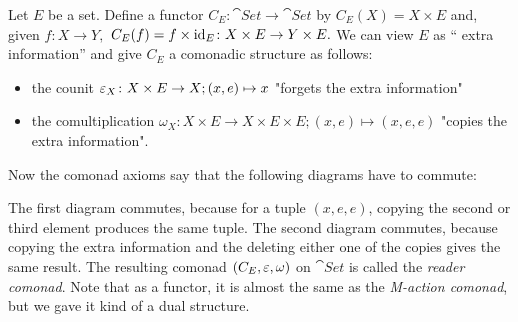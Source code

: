 \begin{example}
    Let $E$ be a set. Define a functor $C_E \colon \cat{Set} \to \cat{Set}$ by
    $C_E(X)=X \times E$ and, given $f \colon X \to Y,$ $C_E(f) = f \times \operatorname{id}_E
    \colon X \times E \to Y \times E.$
    We can view $E$ as `` extra information'' and give $C_E$ a comonadic structure as follows:
    \begin{itemize}
        \item the counit $\varepsilon_X \colon X \times E \to X; (x,e)\mapsto x$ 
         "forgets the extra information"
        \item the comultiplication $\omega_X \colon X \times E \to X \times E \times E;
        (x,e)\mapsto (x,e,e)$ 
        "copies the extra information".
    \end{itemize}
    Now the comonad axioms say that the following diagrams have to commute:
    \begin{figure}[H]
        \small
    \centering
    \begin{subfigure}{0.45\textwidth}
    \centering
    \end{subfigure}
    \hspace{2em}
    \begin{subfigure}{0.46\textwidth}
    \centering
    \end{subfigure}
    \end{figure}
    The first diagram commutes, because for a tuple $(x,e,e)$, copying the second or 
    third element produces the same tuple. The second diagram commutes, because copying 
    the extra information and the deleting either one of the copies gives the same result.
    The resulting comonad $(C_E,\varepsilon,\omega)$ on $\cat{Set}$ is called the \textit{reader comonad}.
    Note that as a functor, it is almost the same as the \textit{M-action comonad}, but we gave it
    kind of a dual structure.
\end{example}


